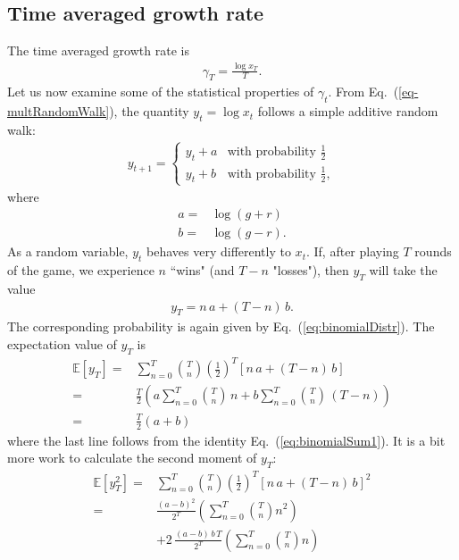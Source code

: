 \documentclass[11pt]{article}
\begin{document}
\begin{multicols}{2}
\section{Time averaged growth rate}
The time averaged growth rate is
\begin{align}
\label{eq:gammaT}
\gamma_T = \frac{\log x_T}{T}.
\end{align}
Let us now examine some of the statistical properties of $\gamma_t$.
From Eq.~(\ref{eq-multRandomWalk}), the quantity $y_t = \log x_t$ follows a simple additive random walk:
\begin{align}
\label{eq-addRandomWalk}
y_{t+1} = \left\{ 
\begin{array}{ll}
y_t + a& \text{with probability $\frac{1}{2}$}\\
y_t + b  & \text{with probability $\frac{1}{2}$},
\end{array}
\right.
\end{align}
where 
\begin{align*}
a =& \log (g+r)\\
b = & \log (g-r). 
\end{align*}
As a random variable, $y_t$ behaves very differently to $x_t$.  If, after playing $T$ rounds of the game, we experience $n$ ``wins" (and $T-n$ "losses"), then $y_T$ will take the value
\begin{align*}
y_T =  n\, a + (T-n)\,b.
\end{align*}
The corresponding probability is again given by Eq.~(\ref{eq:binomialDistr}). 
The expectation value of $y_T$ is 
\begin{align}
\nonumber \mathbb{E}\left[y_T \right] =& \sum_{n=0}^T  {T \choose n} \left(\frac{1}{2}\right)^T  \left[ n\, a + (T-n)\,b \right] \\
\nonumber  = & \frac{T}{2} \left( a \sum_{n=0}^T {T \choose n} \,n + b \sum_{n=0}^T {T \choose n} \,(T-n)\right)\\
\label{eq-expectationyT}=&  \frac{T}{2} \left(a  + b \right)
\end{align}
where the last line follows from the identity Eq.~(\ref{eq:binomialSum1}).
It is a bit more work to calculate the second moment of $y_T$:
\begin{align}
\nonumber \mathbb{E}\left[y_T^2 \right] =& \sum_{n=0}^T  {T \choose n} \left(\frac{1}{2}\right)^T  \left[ n\, a + (T-n)\,b \right] ^2\\
\nonumber =& \frac{(a-b)^2}{2^T}\left( \sum_{n=0}^T  {T \choose n} n^2 \right) \\
\nonumber & +  2\, \frac{(a - b)\, b\, T}{2^T} \left(\sum_{n=0}^T  {T \choose n} n \right) \\

\end{align}
\end{multicols}
\end{document}
